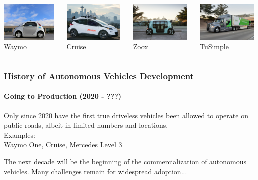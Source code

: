 \begin{frame}
\begin{columns}[T]
    \begin{column}{.25\textwidth}
        \centering
        \includegraphics[height=1.9cm]{images/waymo_firefly.jpg} \\
        \footnotesize Waymo \cite{WaymoPress}
    \end{column}
    \begin{column}{.25\textwidth}
        \centering
        \includegraphics[height=1.9cm]{images/cruise_vehicle.jpg} \\
        \footnotesize Cruise \cite{CruiseNews}
    \end{column}
    \begin{column}{.25\textwidth}
        \centering
        \includegraphics[height=1.9cm]{images/zoox_vehicle.jpg} \\
        \footnotesize Zoox \cite{ZooxPress}
    \end{column}
    \begin{column}{.25\textwidth}
        \centering
        \includegraphics[height=1.9cm]{images/tusimple_vehicle.jpg} \\
        \footnotesize TuSimple \cite{TuSimpleMedia}
    \end{column}
\end{columns}
\end{frame}

\begin{frame}
\frametitle{History of Autonomous Vehicles Development}
\framesubtitle{Going to Production (2020 - ???)}
Only since 2020 have the first true driveless vehicles been allowed to operate
on public roads, albeit in limited numbers and locations.\\
\vspace{0.5cm}
Examples: \\
Waymo One, Cruise, Mercedes Level 3
\begin{block}{}
The next decade will be the beginning of the commercialization of autonomous
vehicles. Many challenges remain for widespread adoption...
\end{block}
\end{frame}